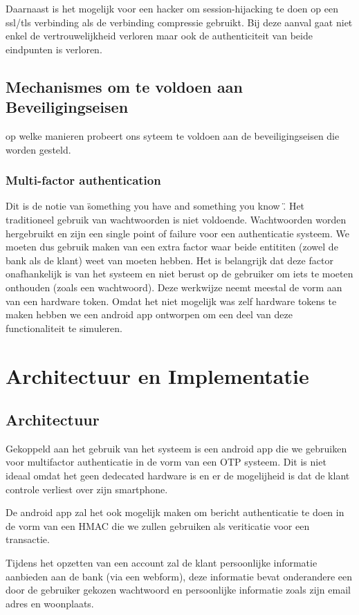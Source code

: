 \documentclass[11pt]{article}
\begin{document}
Daarnaast is het mogelijk voor een hacker om session-hijacking te doen op een ssl/tls verbinding als de verbinding compressie gebruikt. Bij deze aanval gaat niet enkel de vertrouwelijkheid verloren maar ook de authenticiteit van beide eindpunten is verloren.

\subsection{Mechanismes om te voldoen aan Beveiligingseisen}
op welke manieren probeert ons syteem te voldoen aan de beveiligingseisen die worden gesteld.

\subsubsection{Multi-factor authentication}
Dit is de notie van \"something you have and something you know \". 
Het traditioneel gebruik van wachtwoorden is niet voldoende. Wachtwoorden worden hergebruikt en zijn een single point of failure voor een authenticatie systeem. We moeten dus gebruik maken van een extra factor waar beide entititen (zowel de bank als de klant) weet van moeten hebben. Het is belangrijk dat deze factor onafhankelijk is van het systeem en niet berust op de gebruiker om iets te moeten onthouden (zoals een wachtwoord). Deze werkwijze neemt meestal de vorm aan van een hardware token. Omdat het niet mogelijk was zelf hardware tokens te maken hebben we een android app ontworpen om een deel van deze functionaliteit te simuleren.
\section{Architectuur en Implementatie}
\subsection{Architectuur}
Gekoppeld aan het gebruik van het systeem is een android app die we gebruiken voor multifactor authenticatie in de vorm van een OTP systeem. Dit is niet ideaal omdat het geen dedecated hardware is en er de mogelijheid is dat de klant controle verliest over zijn smartphone.

De android app zal het ook mogelijk maken om bericht authenticatie te doen in de vorm van een HMAC die we zullen gebruiken als veriticatie voor een transactie.

Tijdens het opzetten van een account zal de klant persoonlijke informatie aanbieden aan de bank (via een webform), deze informatie bevat onderandere een door de gebruiker gekozen wachtwoord en persoonlijke informatie zoals zijn email adres en woonplaats.
\end{document}
